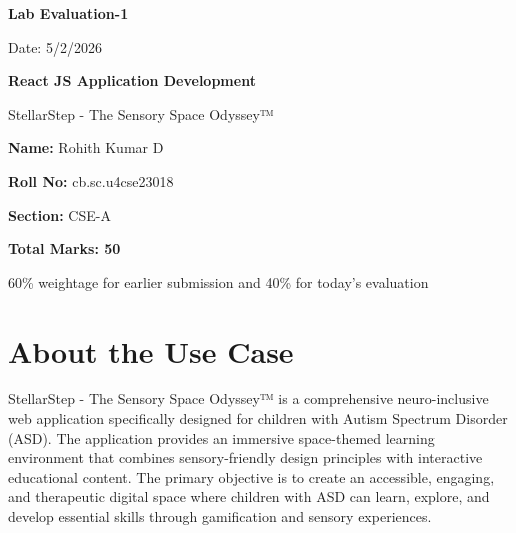 \documentclass[12pt,a4paper]{article}
\begin{document}
\begin{titlepage}
    \centering
    \vspace*{1.5cm}
    
    {\Huge\bfseries Lab Evaluation-1\par}
    \vspace{0.8cm}
    {\Large Date: 5/2/2026\par}
    \vspace{1.5cm}
    
    {\LARGE\textbf{React JS Application Development}\par}
    \vspace{0.4cm}
    {\Large StellarStep - The Sensory Space Odyssey™\par}
    \vspace{2.5cm}
    
    {\Large
    \textbf{Name:} Rohith Kumar D\par}
    \vspace{0.3cm}
    {\Large
    \textbf{Roll No:} cb.sc.u4cse23018\par}
    \vspace{0.3cm}
    {\Large
    \textbf{Section:} CSE-A\par}
    \vspace{2.5cm}
    
    {\large\textbf{Total Marks: 50}\par}
    \vspace{0.2cm}
    {\normalsize 60\% weightage for earlier submission and 40\% for today's evaluation\par}
    
    \vfill
    
\end{titlepage}

\section{About the Use Case}

StellarStep - The Sensory Space Odyssey™ is a comprehensive neuro-inclusive web application specifically designed for children with Autism Spectrum Disorder (ASD). The application provides an immersive space-themed learning environment that combines sensory-friendly design principles with interactive educational content. The primary objective is to create an accessible, engaging, and therapeutic digital space where children with ASD can learn, explore, and develop essential skills through gamification and sensory experiences.
\end{document}
